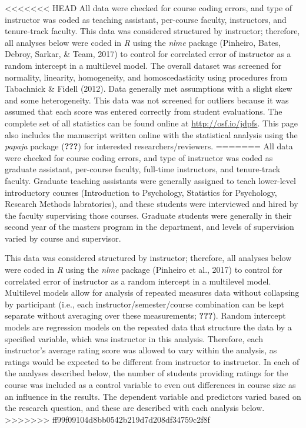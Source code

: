 \documentclass[man]{apa6}
\theoremstyle{definition}
\theoremstyle{definition}
\theoremstyle{definition}
\theoremstyle{remark}
\begin{document}
\textless{}\textless{}\textless{}\textless{}\textless{}\textless{}\textless{}
HEAD All data were checked for course coding errors, and type of
instructor was coded as teaching assistant, per-course faculty,
instructors, and tenure-track faculty. This data was considered
structured by instructor; therefore, all analyses below were coded in
\emph{R} using the \emph{nlme} package (Pinheiro, Bates, Debroy, Sarkar,
\& Team, 2017) to control for correlated error of instructor as a random
intercept in a multilevel model. The overall dataset was screened for
normality, linearity, homogeneity, and homoscedasticity using procedures
from Tabachnick \& Fidell (2012). Data generally met assumptions with a
slight skew and some heterogeneity. This data was not screened for
outliers because it was assumed that each score was entered correctly
from student evaluations. The complete set of all statistics can be
found online at \url{http://osf.io/jdpfs}. This page also includes the
manuscript written online with the statistical analysis using the
\emph{papaja} package ({\textbf{???}}) for interested
researchers/reviewers. ======= All data were checked for course coding
errors, and type of instructor was coded as graduate assistant,
per-course faculty, full-time instructors, and tenure-track faculty.
Graduate teaching assistants were generally assigned to teach
lower-level introductory courses (Introduction to Psychology, Statistics
for Psychology, Research Methods labratories), and these students were
interviewed and hired by the faculty supervising those courses. Graduate
students were generally in their second year of the masters program in
the department, and levels of supervision varied by course and
supervisor.

This data was considered structured by instructor; therefore, all
analyses below were coded in \emph{R} using the \emph{nlme} package
(Pinheiro et al., 2017) to control for correlated error of instructor as
a random intercept in a multilevel model. Multilevel models allow for
analysis of repeated measures data without collapsing by participant
(i.e., each instructor/semester/course combination can be kept separate
without averaging over these measurements; {\textbf{???}}). Random
intercept models are regression models on the repeated data that
structure the data by a specified variable, which was instructor in this
analysis. Therefore, each instructor's average rating score was allowed
to vary within the analysis, as ratings would be expected to be
different from instructor to instructor. In each of the analyses
described below, the number of students providing ratings for the course
was included as a control variable to even out differences in course
size as an influence in the results. The dependent variable and
predictors varied based on the research question, and these are
described with each analysis below.
\textgreater{}\textgreater{}\textgreater{}\textgreater{}\textgreater{}\textgreater{}\textgreater{}
ff99f09104d8bb0542b219d7d208df34759c2f8f
\end{document}

